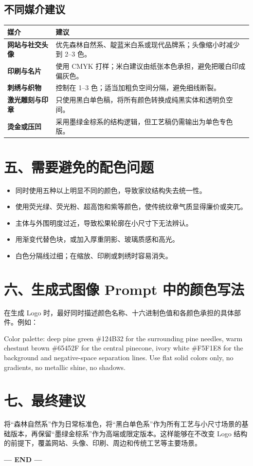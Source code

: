 \documentclass[10.5pt,a4paper,fontset=none]{ctexart}
\begin{document}
\subsection{不同媒介建议}
\begin{tabularx}{\textwidth}{>{\bfseries}p{31mm}Y}\toprule
\sffamily 媒介 & \sffamily\bfseries 建议\\\midrule
网站与社交头像 & 优先森林自然系、靛蓝米白系或现代品牌系；头像缩小时减少到 2--3 色。\\
印刷与名片 & 使用 CMYK 打样；米白建议由纸张本色承担，避免把暖白印成偏灰色。\\
刺绣与织物 & 控制在 1--3 色；适当加粗负空间分隔，避免细线断裂。\\
激光雕刻与印章 & 只使用黑白单色稿，将所有颜色转换成纯黑实体和透明负空间。\\
烫金或压凹 & 采用墨绿金棕系的结构逻辑，但工艺稿仍需输出为单色专色版。\\\bottomrule
\end{tabularx}

\section{五、需要避免的配色问题}
\begin{itemize}
\item 同时使用五种以上明显不同的颜色，导致家纹结构失去统一性。
\item 使用荧光绿、荧光粉、超高饱和紫等颜色，使传统纹章气质显得廉价或突兀。
\item 主体与外围明度过近，导致松果轮廓在小尺寸下无法辨认。
\item 用渐变代替色块，或加入厚重阴影、玻璃质感和高光。
\item 白色分隔线过细；在缩放、印刷或刺绣时容易消失。
\end{itemize}

\section{六、生成式图像 Prompt 中的颜色写法}
在生成 Logo 时，最好同时描述颜色名称、十六进制色值和各颜色承担的具体部件。例如：
\begin{promptbox}
Color palette: deep pine green \#124B32 for the surrounding pine needles, warm chestnut brown \#65452F for the central pinecone, ivory white \#F5F1E8 for the background and negative-space separation lines. Use flat solid colors only, no gradients, no metallic shine, no shadows.
\end{promptbox}

\clearpage
\section{七、最终建议}
\begin{leadbox}
将“森林自然系”作为日常标准色，将“黑白单色系”作为所有工艺与小尺寸场景的基础版本，再保留“墨绿金棕系”作为高端或限定版本。这样能够在不改变 Logo 结构的前提下，覆盖网站、头像、印刷、周边和传统工艺等主要场景。
\end{leadbox}
\vfill\begin{center}{\sffamily\bfseries\small\color{gold}— END —}\end{center}
\end{document}
